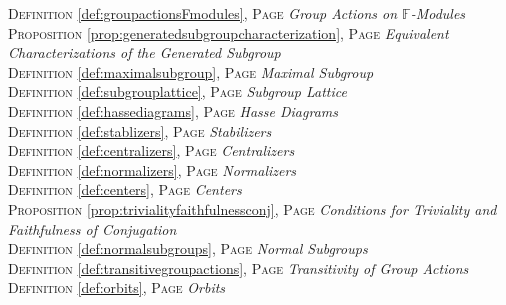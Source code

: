\begin{multicols}{2}
{\textsc{Definition} \ref{def:groupactionsFmodules}, \textsc{Page} \pageref{def:groupactionsFmodules} \textit{Group Actions on \(\mathbb {F}\)-Modules} \\
\textsc{Proposition} \ref{prop:generatedsubgroupcharacterization}, \textsc{Page} \pageref{prop:generatedsubgroupcharacterization} \textit{Equivalent Characterizations of the Generated Subgroup} \\
\textsc{Definition} \ref{def:maximalsubgroup}, \textsc{Page} \pageref{def:maximalsubgroup} \textit{Maximal Subgroup} \\
\textsc{Definition} \ref{def:subgrouplattice}, \textsc{Page} \pageref{def:subgrouplattice} \textit{Subgroup Lattice} \\
\textsc{Definition} \ref{def:hassediagrams}, \textsc{Page} \pageref{def:hassediagrams} \textit{Hasse Diagrams} \\
\textsc{Definition} \ref{def:stablizers}, \textsc{Page} \pageref{def:stablizers} \textit{Stabilizers} \\
\textsc{Definition} \ref{def:centralizers}, \textsc{Page} \pageref{def:centralizers} \textit{Centralizers} \\
\textsc{Definition} \ref{def:normalizers}, \textsc{Page} \pageref{def:normalizers} \textit{Normalizers} \\
\textsc{Definition} \ref{def:centers}, \textsc{Page} \pageref{def:centers} \textit{Centers} \\
\textsc{Proposition} \ref{prop:trivialityfaithfulnessconj}, \textsc{Page} \pageref{prop:trivialityfaithfulnessconj} \textit{Conditions for Triviality and Faithfulness of Conjugation} \\
\textsc{Definition} \ref{def:normalsubgroups}, \textsc{Page} \pageref{def:normalsubgroups} \textit{Normal Subgroups} \\
\textsc{Definition} \ref{def:transitivegroupactions}, \textsc{Page} \pageref{def:transitivegroupactions} \textit{Transitivity of Group Actions} \\
\textsc{Definition} \ref{def:orbits}, \textsc{Page} \pageref{def:orbits} \textit{Orbits} \\

      }
\end{multicols}

